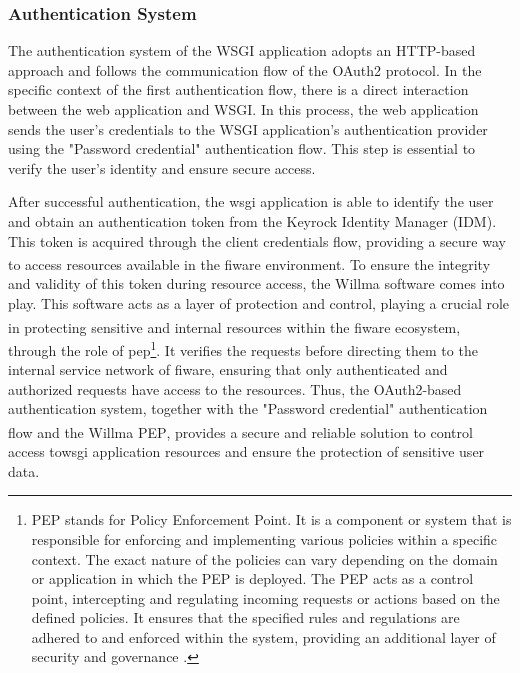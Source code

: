 \subsubsection{Authentication System}
\label{subsubsection:Authentication}
The authentication system of the WSGI application adopts an HTTP-based approach and follows the communication flow of the OAuth2 protocol. In the specific context of the first authentication flow, there is a direct interaction between the web application and WSGI. In this process, the web application sends the user's credentials to the WSGI application's authentication provider using the "Password credential" authentication flow. This step is essential to verify the user's identity and ensure secure access.

After successful authentication, the \acrshort{wsgi} application is able to identify the user and obtain an authentication token from the Keyrock Identity Manager (IDM). This token is acquired through the client credentials flow, providing a secure way to access resources available in the \acrshort{fiware}\textsuperscript{\textregistered} environment. To ensure the integrity and validity of this token during resource access, the Willma software comes into play. This software acts as a layer of protection and control, playing a crucial role in protecting sensitive and internal resources within the \acrshort{fiware}\textsuperscript{\textregistered} ecosystem, through the role of \acrfull{pep}\footnote{PEP stands for Policy Enforcement Point. It is a component or system that is responsible for enforcing and implementing various policies within a specific context. The exact nature of the policies can vary depending on the domain or application in which the PEP is deployed. The PEP acts as a control point, intercepting and regulating incoming requests or actions based on the defined policies. It ensures that the specified rules and regulations are adhered to and enforced within the system, providing an additional layer of security and governance \cite{mont2006}.}.  It verifies the requests before directing them to the internal service network of \acrlong{fiware}, ensuring that only authenticated and authorized requests have access to the resources. Thus, the OAuth2-based authentication system, together with the "Password credential" authentication flow and the Willma PEP\textsuperscript{\textregistered}, provides a secure and reliable solution to control access to\acrshort{wsgi} application resources and ensure the protection of sensitive user data.


